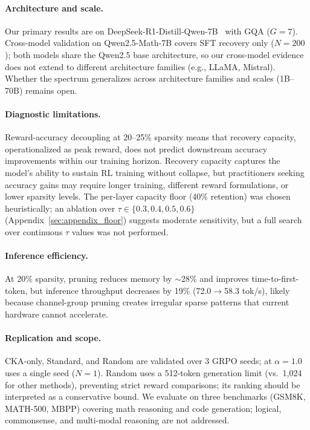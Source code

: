 
\paragraph{Architecture and scale.}
Our primary results are on DeepSeek-R1-Distill-Qwen-7B~\citep{deepseek2025r1} with GQA ($G{=}7$).
Cross-model validation on Qwen2.5-Math-7B covers SFT recovery only ($N{=}200$); both models share the Qwen2.5 base architecture, so our cross-model evidence does not extend to different architecture families (e.g., LLaMA, Mistral).
Whether the spectrum generalizes across architecture families and scales (1B--70B) remains open.

\paragraph{Diagnostic limitations.}
Reward-accuracy decoupling at 20--25\% sparsity means that recovery capacity, operationalized as peak reward, does not predict downstream accuracy improvements within our training horizon.
Recovery capacity captures the model's ability to sustain RL training without collapse, but practitioners seeking accuracy gains may require longer training, different reward formulations, or lower sparsity levels.
The per-layer capacity floor (40\% retention) was chosen heuristically; an ablation over $\tau \in \{0.3, 0.4, 0.5, 0.6\}$ (Appendix~\ref{sec:appendix_floor}) suggests moderate sensitivity, but a full search over continuous $\tau$ values was not performed.

\paragraph{Inference efficiency.}
At 20\% sparsity, pruning reduces memory by ${\sim}$28\% and improves time-to-first-token, but inference throughput decreases by 19\% (72.0$\to$58.3 tok/s), likely because channel-group pruning creates irregular sparse patterns that current hardware cannot accelerate.

\paragraph{Replication and scope.}
CKA-only, Standard, and Random are validated over 3 GRPO seeds; \rasp{} at $\alpha{=}1.0$ uses a single seed ($N{=}1$).
Random uses a 512-token generation limit (vs.\ 1{,}024 for other methods), preventing strict reward comparisons; its ranking should be interpreted as a conservative bound.
We evaluate on three benchmarks (GSM8K, MATH-500, MBPP) covering math reasoning and code generation; logical, commonsense, and multi-modal reasoning are not addressed.
